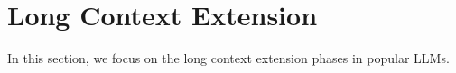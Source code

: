 \section{Long Context Extension}
\label{sec:longcontext}
In this section, we focus on the long context extension phases in popular LLMs. 






